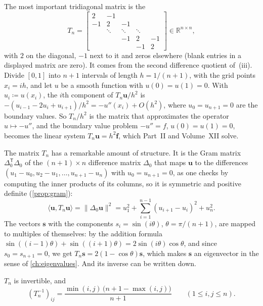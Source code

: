The most important tridiagonal matrix is the 
\[
T_n=\begin{bmatrix}2&-1&&&\\-1&2&-1&&\\&\ddots&\ddots&\ddots&\\&&-1&2&-1\\&&&-1&2\end{bmatrix}\in\mathbb R^{n\times n},
\]
with $2$ on the diagonal, $-1$ next to it and zeros elsewhere (blank entries in a displayed matrix are zero). It comes from the second difference quotient of \,(iii). Divide $[0,1]$ into $n+1$ intervals of length $h=1/(n+1)$, with the grid points $x_i=ih$, and let $u$ be a smooth function with $u(0)=u(1)=0$. With $u_i\coloneqq u(x_i)$, the $i$th component of $T_n\mathbf u/h^2$ is $-(u_{i-1}-2u_i+u_{i+1})/h^2=-u''(x_i)+O(h^2)$, where $u_0=u_{n+1}=0$ are the boundary values. So $T_n/h^2$ is the matrix that approximates the operator $u\mapsto-u''$, and the boundary value problem $-u''=f$, $u(0)=u(1)=0$, becomes the linear system $T_n\mathbf u=h^2\mathbf f$, which Part~II and Volume~XII solve.

The matrix $T_n$ has a remarkable amount of structure. It is the Gram matrix $\Delta_0^{\mathsf T}\Delta_0$ of the $(n+1)\times n$ difference matrix $\Delta_0$ that maps $\mathbf u$ to the differences $(u_1-u_0,u_2-u_1,\ldots,u_{n+1}-u_n)$ with $u_0=u_{n+1}=0$, as one checks by computing the inner products of its columns, so it is symmetric and positive definite (\cref{prop:gram}):
\[
\langle\mathbf u,T_n\mathbf u\rangle=\|\Delta_0\mathbf u\|^2=u_1^2+\sum_{i=1}^{n-1}(u_{i+1}-u_i)^2+u_n^2 .
\]
The vectors $\mathbf s$ with the components $s_i=\sin(i\theta)$, $\theta=\pi/(n+1)$, are mapped to multiples of themselves: by the addition formula $\sin((i-1)\theta)+\sin((i+1)\theta)=2\sin(i\theta)\cos\theta$, and since $s_0=s_{n+1}=0$, we get $T_n\mathbf s=2(1-\cos\theta)\mathbf s$, which makes $\mathbf s$ an eigenvector in the sense of \cref{ch:eigenvalues}. And its inverse can be written down.

\begin{proposition}
\label{prop:second-difference-inverse}
$T_n$ is invertible, and
\[
(T_n^{-1})_{ij}=\frac{\min(i,j)\,\bigl(n+1-\max(i,j)\bigr)}{n+1}\qquad(1\le i,j\le n).
\]
\end{proposition}

